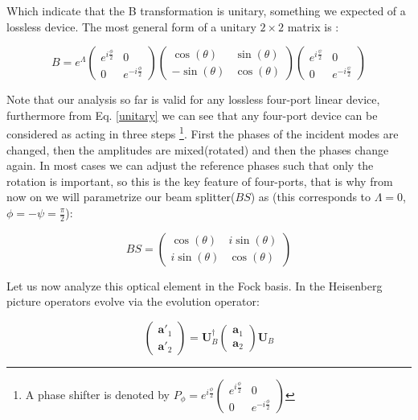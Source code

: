 \documentclass{book}
\begin{document}
Which indicate that the B transformation is unitary, something we expected of a lossless device. The most general form of a unitary $2\times2$ matrix is \cite{leonhardt}:


\begin{equation}
B=e^{\Lambda} \begin{pmatrix} e^{i\frac{\phi}{2}} & 0 \\ 0 & e^{-i\frac{\phi}{2}} \end{pmatrix} \begin{pmatrix} \cos(\theta) &  \sin(\theta) \\ - \sin(\theta) & \cos(\theta) \end{pmatrix} \begin{pmatrix} e^{i\frac{\psi}{2}} & 0 \\ 0 & e^{-i\frac{\psi}{2}} \end{pmatrix} \label{unitary}
\end{equation}

Note that our analysis so far is valid for any lossless four-port linear device, furthermore from Eq. \ref{unitary} we can see that any four-port device can be considered as acting in three steps \footnote{A phase shifter is denoted by $P_{\phi}=e^{i \frac{\phi}{2}}\begin{pmatrix}e^{i \frac{\phi}{2}} & 0 \\0 & e^{-i \frac{\phi}{2}} \end{pmatrix}$}. First the phases of the incident modes are changed, then the amplitudes are mixed(rotated) and then the phases change again. In most cases we can adjust the reference phases such that only the rotation is important, so this is the key feature of four-ports, that is why from now on we will parametrize our beam splitter($BS$) as (this corresponds to $\Lambda=0$,$\phi=-\psi=\frac{\pi}{2}$):


\begin{equation}
BS=\begin{pmatrix} \cos(\theta) & i \sin(\theta) \\ i \sin(\theta) & \cos(\theta) \end{pmatrix}
\end{equation}


Let us now analyze this optical element in the Fock basis. In the Heisenberg picture operators evolve via the evolution operator:

\begin{equation}
\begin{pmatrix} \mathbf{a}'_{1} \\ \mathbf{a}'_{2}\end{pmatrix}=\mathbf{U}^{\dagger}_{B} \begin{pmatrix} \mathbf{a}_{1} \\ \mathbf{a}_{2}\end{pmatrix} \mathbf{U}_{B}
\label{Heisenberg}
\end{equation}
\end{document}
